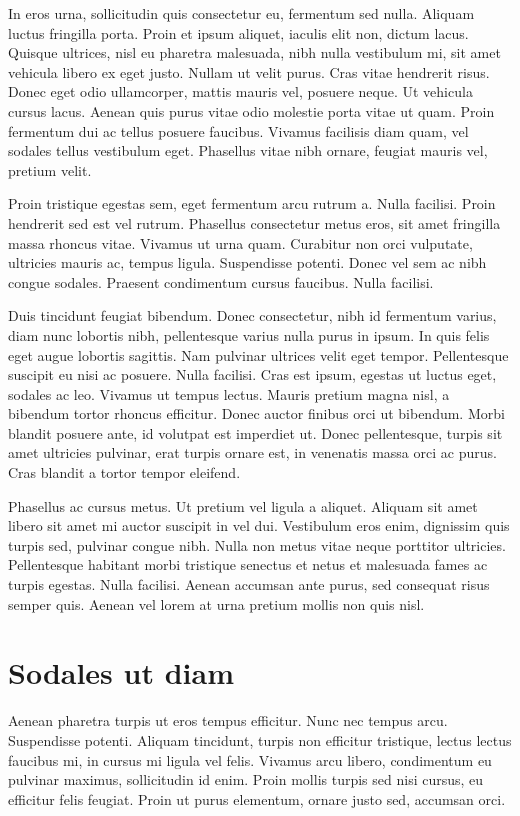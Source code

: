 In eros urna, sollicitudin quis consectetur eu, fermentum sed nulla. Aliquam luctus fringilla porta. Proin et ipsum aliquet, iaculis elit non, dictum lacus. Quisque ultrices, nisl eu pharetra malesuada, nibh nulla vestibulum mi, sit amet vehicula libero ex eget justo. Nullam ut velit purus. Cras vitae hendrerit risus. Donec eget odio ullamcorper, mattis mauris vel, posuere neque. Ut vehicula cursus lacus. Aenean quis purus vitae odio molestie porta vitae ut quam. Proin fermentum dui ac tellus posuere faucibus. Vivamus facilisis diam quam, vel sodales tellus vestibulum eget. Phasellus vitae nibh ornare, feugiat mauris vel, pretium velit.

Proin tristique egestas sem, eget fermentum arcu rutrum a. Nulla facilisi. Proin hendrerit sed est vel rutrum. Phasellus consectetur metus eros, sit amet fringilla massa rhoncus vitae. Vivamus ut urna quam. Curabitur non orci vulputate, ultricies mauris ac, tempus ligula. Suspendisse potenti. Donec vel sem ac nibh congue sodales. Praesent condimentum cursus faucibus. Nulla facilisi.

Duis tincidunt feugiat bibendum. Donec consectetur, nibh id fermentum varius, diam nunc lobortis nibh, pellentesque varius nulla purus in ipsum. In quis felis eget augue lobortis sagittis. Nam pulvinar ultrices velit eget tempor. Pellentesque suscipit eu nisi ac posuere. Nulla facilisi. Cras est ipsum, egestas ut luctus eget, sodales ac leo. Vivamus ut tempus lectus. Mauris pretium magna nisl, a bibendum tortor rhoncus efficitur. Donec auctor finibus orci ut bibendum. Morbi blandit posuere ante, id volutpat est imperdiet ut. Donec pellentesque, turpis sit amet ultricies pulvinar, erat turpis ornare est, in venenatis massa orci ac purus. Cras blandit a tortor tempor eleifend.

Phasellus ac cursus metus. Ut pretium vel ligula a aliquet. Aliquam sit amet libero sit amet mi auctor suscipit in vel dui. Vestibulum eros enim, dignissim quis turpis sed, pulvinar congue nibh. Nulla non metus vitae neque porttitor ultricies. Pellentesque habitant morbi tristique senectus et netus et malesuada fames ac turpis egestas. Nulla facilisi. Aenean accumsan ante purus, sed consequat risus semper quis. Aenean vel lorem at urna pretium mollis non quis nisl.

\section{Sodales ut diam}
Aenean pharetra turpis ut eros tempus efficitur. Nunc nec tempus arcu. Suspendisse potenti. Aliquam tincidunt, turpis non efficitur tristique, lectus lectus faucibus mi, in cursus mi ligula vel felis. Vivamus arcu libero, condimentum eu pulvinar maximus, sollicitudin id enim. Proin mollis turpis sed nisi cursus, eu efficitur felis feugiat. Proin ut purus elementum, ornare justo sed, accumsan orci.

